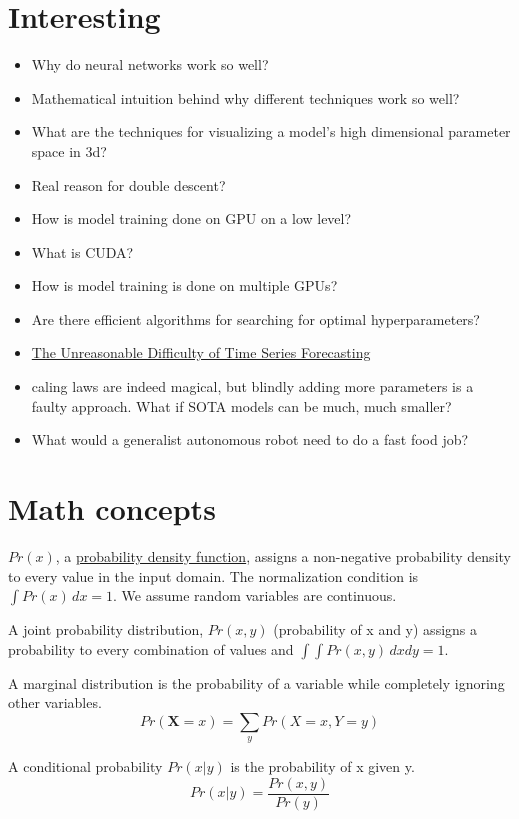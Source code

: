\documentclass{article}
\begin{document}
\section{Interesting}
\begin{itemize}
\item Why do neural networks work so well?
  \item Mathematical intuition behind why different techniques work so well?
  \item What are the techniques for visualizing a model's high dimensional parameter space in 3d?
  \item Real reason for double descent?
\item How is model training done on GPU on a low level?
  \item What is CUDA?
  \item How is model training is done on multiple GPUs?
\item Are there efficient algorithms for searching for optimal hyperparameters?
\item \href{https://suzyahyah.github.io/machine%20learning/2026/06/27/trouble-with-time-series.html}{The Unreasonable Difficulty of Time Series Forecasting}
\item caling laws are indeed magical, but blindly adding more parameters is a faulty approach. What if SOTA models can be much, much smaller?
\item What would a generalist autonomous robot need to do a fast food job?
\end{itemize}

\section{Math concepts}
$Pr(x)$, a \href{https://medium.com/@kavya8a/understanding-probability-density-functions-a-beginners-guide-06c9821ed5c0}{probability density function}, assigns a non-negative probability density to every value in the input domain. The normalization condition is $\int Pr(x)\,dx = 1$. We assume random variables are continuous.

A joint probability distribution, $Pr(x, y)$ (probability of x and y) assigns a probability to every combination of values and $\int \int Pr(x, y) \,dxdy = 1$.

A marginal distribution is the probability of a variable while completely ignoring other variables.
\[ Pr(\mathbf{X} = x) = \sum_{y} Pr(X = x, Y = y) \]

A conditional probability $Pr(x|y)$ is the probability of x given y.
\[ Pr(x|y) = \frac{Pr(x, y)}{Pr(y)} \]
\end{document}
